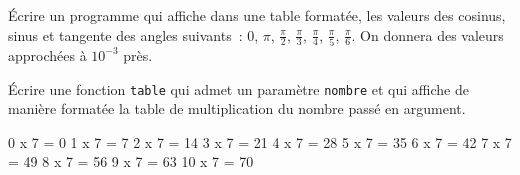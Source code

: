\begin{exercice}
Écrire un programme qui affiche dans une table formatée, les valeurs des cosinus, sinus et tangente des angles suivants~: $0$,  $\pi$, $\frac{\pi}2$, $\frac{\pi}3$, $\frac{\pi}4$, $\frac{\pi}5$, $\frac{\pi}6$. On donnera des valeurs approchées à $10^{-3}$ près.
\end{exercice}

\begin{exercice}
Écrire une fonction \texttt{table} qui admet un paramètre \texttt{nombre} et qui affiche de manière formatée la table de multiplication du nombre passé en argument.
\begin{pythoncode}
0  x 7 = 0
1  x 7 = 7
2  x 7 = 14
3  x 7 = 21
4  x 7 = 28
5  x 7 = 35
6  x 7 = 42
7  x 7 = 49
8  x 7 = 56
9  x 7 = 63
10 x 7 = 70
\end{pythoncode}
\end{exercice}